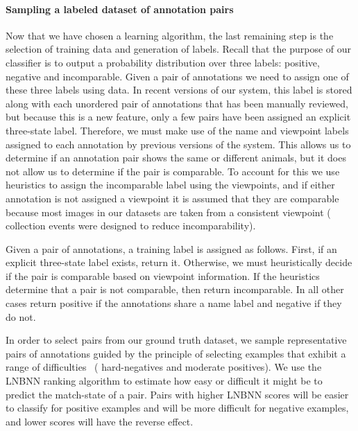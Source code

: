     \paragraph{Sampling a labeled dataset of annotation pairs}
    Now that we have chosen a learning algorithm, the last remaining step is the selection of training data and
      generation of labels.
    Recall that the purpose of our classifier is to output a probability distribution over three labels:
    positive, negative and incomparable.
    Given a pair of annotations we need to assign one of these three labels using \groundtruth{} data.
    In recent versions of our system, this \groundtruth{} label is stored along with each unordered pair of
      annotations that has been manually reviewed, but because this is a new feature, only a few pairs have been
      assigned an explicit three-state label.
    Therefore, we must make use of the name and viewpoint labels assigned to each annotation by previous versions
      of the system.
    This allows us to determine if an annotation pair shows the same or different animals, but it does not allow
      us to determine if the pair is comparable.
    To account for this we use heuristics to assign the incomparable label using the viewpoints, and if either
      annotation is not assigned a viewpoint it is assumed that they are comparable because most images in our
      datasets are taken from a consistent viewpoint (\ie{} collection events were designed to reduce
      incomparability).

    Given a pair of annotations, a training label is assigned as follows.
    First, if an explicit three-state label exists, return it.
    Otherwise, we must heuristically decide if the pair is comparable based on viewpoint information.
    If the heuristics determine that a pair is not comparable, then return incomparable.
    In all other cases return positive if the annotations share a name label and negative if they do not.

    In order to select pairs from our ground truth dataset, we sample representative pairs of annotations guided
      by the principle of selecting examples that exhibit a range of difficulties~\cite{shi_embedding_2016} (\eg
      hard-negatives and moderate positives).
    We use the LNBNN ranking algorithm to estimate how easy or difficult it might be to predict the match-state
      of a pair.
    Pairs with higher LNBNN scores will be easier to classify for positive examples and will be more difficult
      for negative examples, and lower scores will have the reverse effect.

